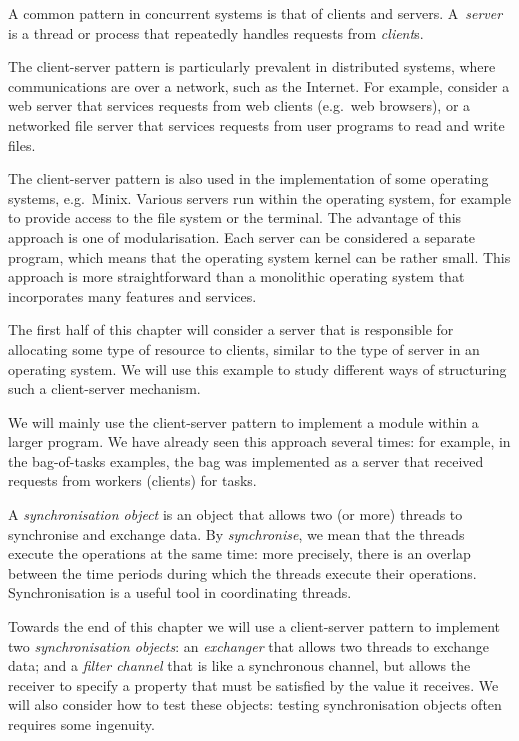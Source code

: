A common pattern in concurrent systems is that of clients and servers.
A~\emph{server} is a thread or process that repeatedly handles requests from
\emph{client}s.

The client-server pattern is particularly prevalent in distributed systems,
where communications are over a network, such as the Internet.  For example,
consider a web server that services requests from web clients (e.g.~web
browsers), or a networked file server that services requests from user
programs to read and write files.

The client-server pattern is also used in the implementation of some
operating systems, e.g.~Minix.  Various servers run within the operating
system, for example to provide access to the file system or the terminal.  The
advantage of this approach is one of modularisation.  Each server can be
considered a separate program, which means that the operating system kernel
can be rather small.  This approach is more straightforward than a monolithic
operating system that incorporates many features and services.

The first half of this chapter will consider a server that is responsible for
allocating some type of resource to clients, similar to the type of server in
an operating system.  We will use this example to study different ways of
structuring such a client-server mechanism.

We will mainly use the client-server pattern to implement a module within a
larger program.  We have already seen this
approach several times: for example, in the bag-of-tasks examples, the bag was
implemented as a server that received requests from workers (clients) for
tasks.
 
A \emph{synchronisation object} is an object that allows two (or more) threads
to synchronise and exchange data.  By \emph{synchronise}, we mean that the
threads execute the operations at the same time: more precisely, there is an
overlap between the time periods during which the threads execute their
operations.  Synchronisation is a useful tool in coordinating threads. 

Towards the end of this chapter we will use a client-server pattern to
implement two \emph{synchronisation objects}: an \emph{exchanger} that allows
two threads to exchange data; and a \emph{filter channel} that is like a
synchronous channel, but allows the receiver to specify a property that must
be satisfied by the value it receives.  We will also consider how to test
these objects: testing synchronisation objects often requires some ingenuity.

